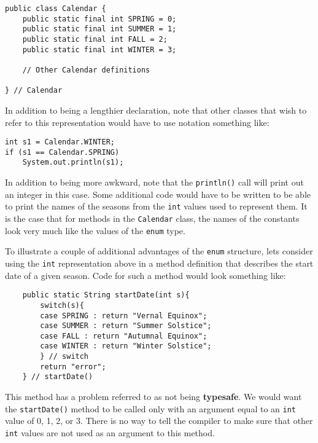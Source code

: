 \begin{jjjlisting}
\begin{lstlisting}
public class Calendar {
    public static final int SPRING = 0;
    public static final int SUMMER = 1;
    public static final int FALL = 2;
    public static final int WINTER = 3;
    
    // Other Calendar definitions
    
} // Calendar
\end{lstlisting}
\end{jjjlisting}

\noindent In addition to being a lengthier declaration, note that other classes 
that wish to refer to this representation would have to use notation something like:
 
\begin{jjjlisting}
\begin{lstlisting}
int s1 = Calendar.WINTER;
if (s1 == Calendar.SPRING)
    System.out.println(s1);    
\end{lstlisting}
\end{jjjlisting}
 
\noindent In addition to being more awkward, note that the {\tt println()}
call will print out an integer in this case.  Some additional code would have 
to be written to be able to print the names of the seasons from the
{\tt int} values used to represent them.  It is the case that for methods in the
{\tt Calendar} class, the names of the constants look very much like the
values of the {\tt enum} type.

To illustrate a couple of additional advantages of the {\tt enum}
structure, lets consider using the {\tt int} representation above in a method
definition that describes the start date of a given season. Code for such a method
would look something like:

\begin{jjjlisting}
\begin{lstlisting}
    public static String startDate(int s){
        switch(s){
        case SPRING : return "Vernal Equinox";
        case SUMMER : return "Summer Solstice";
        case FALL : return "Autumnal Equinox";
        case WINTER : return "Winter Solstice";
        } // switch
        return "error";
    } // startDate()   
\end{lstlisting}
\end{jjjlisting}

\noindent This method has a problem referred to as not being {\bf typesafe}.
We would want the {\tt startDate()} method to be called only with an
argument equal to an {\tt int} value of 0, 1, 2,  or 3.  There is no
way to tell the compiler to make sure that other {\tt int} values
are not used as an argument to this method.

